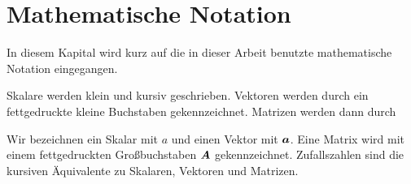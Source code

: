 \chapter{Mathematische Notation}
\label{ch:MathematischeNotation}

In diesem Kapital wird kurz auf die in dieser Arbeit benutzte mathematische Notation eingegangen.

Skalare werden klein und kursiv geschrieben.
Vektoren werden durch ein fettgedruckte kleine Buchstaben gekennzeichnet.
Matrizen werden dann durch

Wir bezeichnen ein Skalar mit $a$ und einen Vektor mit $\boldsymbol{a}$. Eine Matrix wird mit einem fettgedruckten Großbuchstaben $\boldsymbol{A}$ gekennzeichnet.
Zufallszahlen sind die kursiven Äquivalente zu Skalaren, Vektoren und Matrizen.

